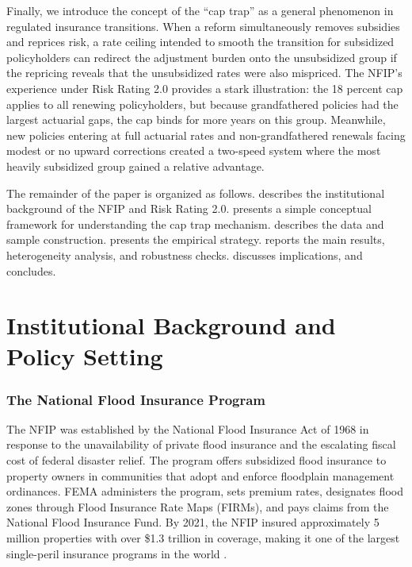 \documentclass[12pt]{article}
\begin{document}
Finally, we introduce the concept of the ``cap trap'' as a general phenomenon in regulated insurance transitions. When a reform simultaneously removes subsidies and reprices risk, a rate ceiling intended to smooth the transition for subsidized policyholders can redirect the adjustment burden onto the unsubsidized group if the repricing reveals that the unsubsidized rates were also mispriced. The NFIP's experience under Risk Rating 2.0 provides a stark illustration: the 18 percent cap applies to all renewing policyholders, but because grandfathered policies had the largest actuarial gaps, the cap binds for more years on this group. Meanwhile, new policies entering at full actuarial rates and non-grandfathered renewals facing modest or no upward corrections created a two-speed system where the most heavily subsidized group gained a relative advantage.

The remainder of the paper is organized as follows.  describes the institutional background of the NFIP and Risk Rating 2.0.  presents a simple conceptual framework for understanding the cap trap mechanism.  describes the data and sample construction.  presents the empirical strategy.  reports the main results, heterogeneity analysis, and robustness checks.  discusses implications, and  concludes.


\section{Institutional Background and Policy Setting}
\label{sec:background}

\subsubsection*{The National Flood Insurance Program} The NFIP was established by the National Flood Insurance Act of 1968 in response to the unavailability of private flood insurance and the escalating fiscal cost of federal disaster relief. The program offers subsidized flood insurance to property owners in communities that adopt and enforce floodplain management ordinances. FEMA administers the program, sets premium rates, designates flood zones through Flood Insurance Rate Maps (FIRMs), and pays claims from the National Flood Insurance Fund. By 2021, the NFIP insured approximately 5 million properties with over \$1.3 trillion in coverage, making it one of the largest single-peril insurance programs in the world \citep{kousky2018, horn2018}.
\end{document}
